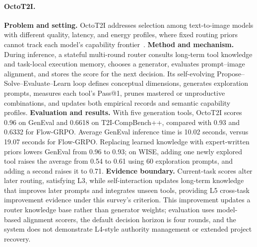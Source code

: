 \paragraph{OctoT2I.}
\textbf{Problem and setting.} OctoT2I addresses selection among text-to-image models with different quality, latency, and energy profiles, where fixed routing priors cannot track each model's capability frontier~\cite{jiang2026octot2i}. \textbf{Method and mechanism.} During inference, a stateful multi-round router consults long-term tool knowledge and task-local execution memory, chooses a generator, evaluates prompt--image alignment, and stores the score for the next decision. Its self-evolving Propose--Solve--Evaluate--Learn loop defines conceptual dimensions, generates exploration prompts, measures each tool's Pass@1, prunes mastered or unproductive combinations, and updates both empirical records and semantic capability profiles. \textbf{Evaluation and results.} With five generation tools, OctoT2I scores 0.96 on GenEval and 0.6618 on T2I-CompBench++, compared with 0.93 and 0.6332 for Flow-GRPO. Average GenEval inference time is 10.02 seconds, versus 19.07 seconds for Flow-GRPO. Replacing learned knowledge with expert-written priors lowers GenEval from 0.96 to 0.93; on WISE, adding one newly explored tool raises the average from 0.54 to 0.61 using 60 exploration prompts, and adding a second raises it to 0.71. \textbf{Evidence boundary.} Current-task scores alter later routing, satisfying L3, while self-interaction updates long-term knowledge that improves later prompts and integrates unseen tools, providing L5 cross-task improvement evidence under this survey's criterion. This improvement updates a router knowledge base rather than generator weights; evaluation uses model-based alignment scorers, the default decision horizon is four rounds, and the system does not demonstrate L4-style authority management or extended project recovery.

